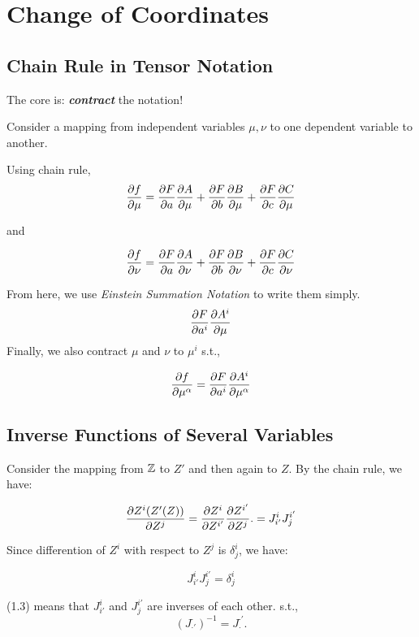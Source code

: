 \documentclass[../main.tex]{subfiles}
\begin{document}
\vfill
\newpage
\chapter{Change of Coordinates}
\section{Chain Rule in Tensor Notation}

The core is: \textit{\textbf{contract}} the notation!

 Consider a mapping from independent variables $\mu, \nu$ to one dependent variable to another.

Using chain rule, 
$$\frac{\partial{f}}{\partial{\mu}}=\frac{\partial{F}}{\partial{a}}\frac{\partial{A}}{\partial{\mu}}+\frac{\partial{F}}{\partial{b}}\frac{\partial{B}}{\partial{\mu}}+\frac{\partial{F}}{\partial{c}}\frac{\partial{C}}{\partial{\mu}}$$

and

$$
\frac{\partial{f}}{\partial{\nu}}=\frac{\partial{F}}{\partial{a}}\frac{\partial{A}}{\partial{\nu}}+\frac{\partial{F}}{\partial{b}}\frac{\partial{B}}{\partial{\nu}}+\frac{\partial{F}}{\partial{c}}\frac{\partial{C}}{\partial{\nu}}
$$

From here, we use \textit{Einstein Summation Notation} to write them simply. 
$$\frac{\partial{F}}{\partial{a^i}}\frac{\partial{A^i}}{\partial{\mu}}$$
Finally, we also contract $\mu$ and $\nu$ to $\mu^i$ s.t.,

\begin{equation}
\frac{\partial{f}}{\partial{\mu^{\alpha}}}=\frac{\partial{F}}{\partial{a^i}}\frac{\partial{A^i}}{\partial{\mu^{\alpha}}}
\end{equation}

\section{Inverse Functions of Several Variables}

Consider the mapping from $\mathbb{Z}$ to $Z'$ and then again to $Z$. By the chain rule, we have:

\begin{equation}
\frac{\partial{Z^i(Z'(Z))}}{\partial{Z^j}}=\frac{\partial{Z^i}}{\partial{Z^{i'}}}\frac{\partial{Z^{i'}}}{\partial{Z^j}}.=J^i_{i'}J^{i'}_j
\end{equation}

Since differention of $Z^i$ with respect to $Z^j$ is $\delta^i_j$, we have:

\begin{equation}
    J^i_{i'}J^{i'}_j=\delta^i_j
\end{equation}

(1.3) means that $J^i_{i'}$ and $J^{i'}_j$ are inverses of each other. s.t.,
$$(J^\cdot_{\cdot'})^{-1}=J^{\cdot'}_\cdot.$$
\end{document}

